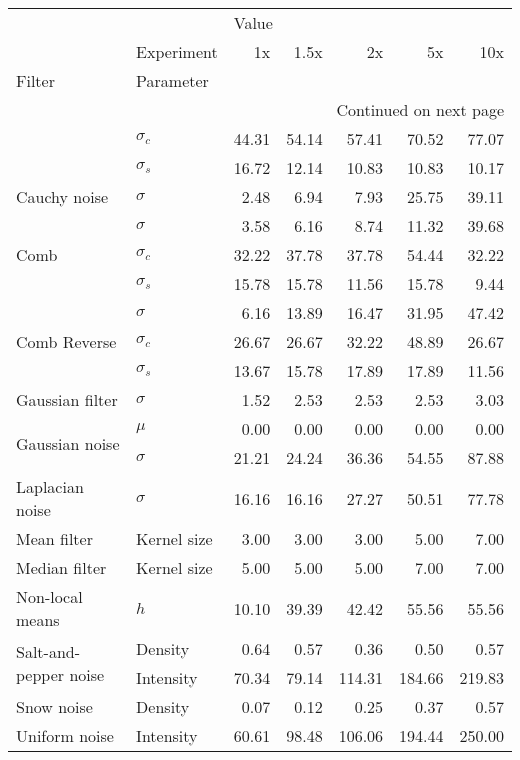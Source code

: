 \begin{longtable}{llrrrrr}
\toprule
              & {} & \multicolumn{5}{l}{Value} \\
              & Experiment &    1x &  1.5x &     2x &     5x &    10x \\
Filter & Parameter &       &       &        &        &        \\
\midrule
\endhead
\midrule
\multicolumn{7}{r}{{Continued on next page}} \\
\midrule
\endfoot

\bottomrule
\endlastfoot
\multirow{2}{*}{Bilateral filter} & $\sigma_c$ & 44.31 & 54.14 &  57.41 &  70.52 &  77.07 \\
              & $\sigma_s$ & 16.72 & 12.14 &  10.83 &  10.83 &  10.17 \\
\cline{1-7}
Cauchy noise & $\sigma$ &  2.48 &  6.94 &   7.93 &  25.75 &  39.11 \\
\multirow{3}{*}{Comb} & $\sigma$ &  3.58 &  6.16 &   8.74 &  11.32 &  39.68 \\
              & $\sigma_c$ & 32.22 & 37.78 &  37.78 &  54.44 &  32.22 \\
              & $\sigma_s$ & 15.78 & 15.78 &  11.56 &  15.78 &   9.44 \\
\cline{1-7}
\multirow{3}{*}{Comb Reverse} & $\sigma$ &  6.16 & 13.89 &  16.47 &  31.95 &  47.42 \\
              & $\sigma_c$ & 26.67 & 26.67 &  32.22 &  48.89 &  26.67 \\
              & $\sigma_s$ & 13.67 & 15.78 &  17.89 &  17.89 &  11.56 \\
\cline{1-7}
Gaussian filter & $\sigma$ &  1.52 &  2.53 &   2.53 &   2.53 &   3.03 \\
\multirow{2}{*}{Gaussian noise} & $\mu$ &  0.00 &  0.00 &   0.00 &   0.00 &   0.00 \\
              & $\sigma$ & 21.21 & 24.24 &  36.36 &  54.55 &  87.88 \\
\cline{1-7}
Laplacian noise & $\sigma$ & 16.16 & 16.16 &  27.27 &  50.51 &  77.78 \\
Mean filter & Kernel size &  3.00 &  3.00 &   3.00 &   5.00 &   7.00 \\
Median filter & Kernel size &  5.00 &  5.00 &   5.00 &   7.00 &   7.00 \\
Non-local means & $h$ & 10.10 & 39.39 &  42.42 &  55.56 &  55.56 \\
\multirow{2}{*}{Salt-and-pepper noise} & Density &  0.64 &  0.57 &   0.36 &   0.50 &   0.57 \\
              & Intensity & 70.34 & 79.14 & 114.31 & 184.66 & 219.83 \\
\cline{1-7}
Snow noise & Density &  0.07 &  0.12 &   0.25 &   0.37 &   0.57 \\
Uniform noise & Intensity & 60.61 & 98.48 & 106.06 & 194.44 & 250.00 \\
\end{longtable}

